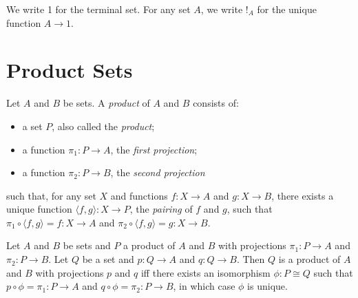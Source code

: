 We write 1 for the terminal set. For any set $A$, we write $!_A$ for the unique function $A \rightarrow 1$.

\section{Product Sets}

\begin{df}[Product]
  Let $A$ and $B$ be sets. A \emph{product} of $A$ and $B$ consists of:
  \begin{itemize}
    \item a set $P$, also called the \emph{product};
    \item a function $\pi_1 : P \rightarrow A$, the \emph{first projection};
    \item a function $\pi_2 : P \rightarrow B$, the \emph{second projection}
  \end{itemize}
  such that, for any set $X$ and functions $f : X \rightarrow A$ and $g : X \rightarrow B$, there exists a unique function $\langle f, g \rangle : X \rightarrow P$,
  the \emph{pairing} of $f$ and $g$, such that $\pi_1 \circ \langle f, g \rangle = f : X \rightarrow A$ and $\pi_2 \circ \langle f, g \rangle = g : X \rightarrow B$.
\end{df}

\begin{prop}
  Let $A$ and $B$ be sets and $P$ a product of $A$ and $B$ with projections $\pi_1 : P \rightarrow A$ and $\pi_2 : P \rightarrow B$. Let $Q$ be a set and $p : Q \rightarrow A$
  and $q : Q \rightarrow B$. Then $Q$ is a product of $A$ and $B$ with projections $p$ and $q$ iff there exists an isomorphism $\phi : P \cong Q$ such that $p \circ \phi = \pi_1 : P \rightarrow A$ and $q \circ \phi = \pi_2 : P \rightarrow B$, in which case $\phi$ is unique.
\end{prop}

